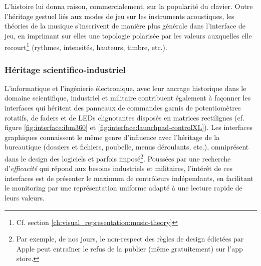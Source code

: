  \indent L'histoire lui donna raison, commercialement, sur la popularité du clavier. Outre l'héritage gestuel liés aux modes de jeu sur les instruments acoustiques, les théories de la musique s'inscrivent de manière plus générale dans l'interface de jeu, en imprimant sur elles une topologie polarisée par les valeurs auxquelles elle recourt\footnote{Cf. section \ref{ch:visual_representation:music-theory}} (rythmes, intensités, hauteurs, timbre, etc.).

\subsubsection{Héritage scientifico-industriel}
\vspace{1em}

\noindent L'informatique et l'ingénierie électronique, avec leur ancrage historique dans le domaine scientifique, industriel et militaire contribuent également à façonner les interfaces qui héritent des panneaux de commandes garnis de potentiomètres rotatifs, de faders et de LEDs clignotantes disposés en matrices rectilignes (cf. figure \ref{fig:interface:ibm360} et \ref{fig:interface:launchpad-controlXL}). Les interfaces graphiques connaissent le même genre d'influence avec l'héritage de la bureautique (dossiers et fichiers, poubelle, menus déroulants, etc.), omniprésent dans le design des logiciels et parfois imposé\footnote{Par exemple, de nos jours, le non-respect des règles de design édictées par Apple peut entraîner le refus de la publier (même gratuitement) sur l'app store.}. Poussées par une recherche d'\textit{efficacité} qui répond aux besoins industriels et militaires, l'intérêt de ces interfaces est de présenter le maximum de contrôleurs indépendants, en facilitant le monitoring par une représentation uniforme adapté à une lecture rapide de leurs valeurs.

